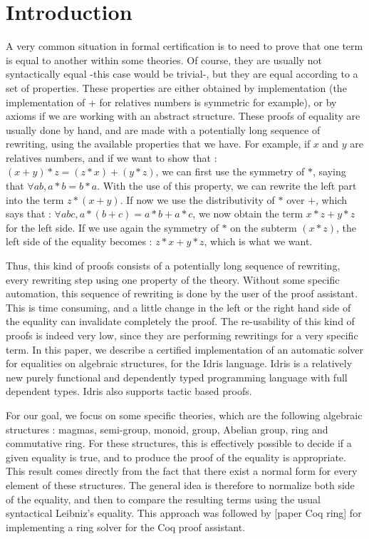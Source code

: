 \section{Introduction}


A very common situation in formal certification is to need to prove that one term is equal to another within some theories. Of course, they are usually not syntactically equal -this case would be trivial-, but they are equal according to a set of properties. These properties are either obtained by implementation (the implementation of + for relatives numbers is symmetric for example), or by axioms if we are working with an abstract structure.
These proofs of equality are usually done by hand, and are made with a potentially long sequence of rewriting, using the available properties that we have. For example, if $x$ and $y$ are relatives numbers, and if we want to show that :
$(x + y) * z = (z * x) + (y * z)$, we can first use the symmetry of $*$, saying that
$\forall a b, a * b = b * a$.
With the use of this property, we can rewrite the left part into the term $z * (x + y)$.
If now we use the distributivity of $*$ over $+$, which says that :
$\forall a b c, a * (b+c) = a*b + a*c$,
we now obtain the term $x*z + y*z$ for the left side.
If we use again the symmetry of $*$ on the subterm $(x*z)$, the left side of the equality becomes : $z*x + y*z$, which is what we want.





Thus, this kind of proofs consists of a potentially long sequence of rewriting, every rewriting step using one property of the theory. Without some specific automation, this sequence of rewriting is done by the user of the proof assistant. This is time consuming, and a little change in the left or the right hand side of the equality can invalidate completely the proof. The re-usability of this kind of proofs is indeed very low, since they are performing rewritings for a very specific term. In this paper, we describe a certified implementation of an automatic solver for equalities on algebraic structures, for the Idris language. Idris is a relatively new purely functional and dependently typed programming language with full dependent types. Idris also supports tactic based proofs. 

For our goal, we focus on some specific theories, which are the following algebraic structures : magmas, semi-group, monoid, group, Abelian group, ring and commutative ring.
For these structures, this is effectively possible to decide if a given equality is true, and to produce the proof of the equality is appropriate. This result comes directly from the fact that there exist a normal form for every element of these structures. The general idea is therefore to normalize both side of the equality, and then to compare the resulting terms using the usual syntactical Leibniz's equality.
This approach was followed by [paper Coq ring] for implementing a ring solver for the Coq proof assistant.

